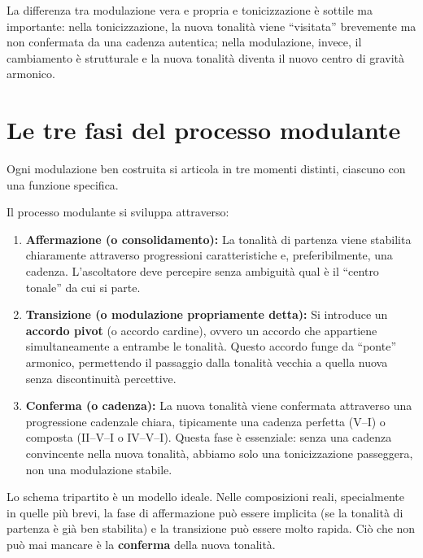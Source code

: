 La differenza tra modulazione vera e propria e tonicizzazione è sottile ma importante: nella tonicizzazione, la nuova tonalità viene ``visitata'' brevemente ma non confermata da una cadenza autentica; nella modulazione, invece, il cambiamento è strutturale e la nuova tonalità diventa il nuovo centro di gravità armonico.

\section{Le tre fasi del processo modulante}
\label{sec:fasi_modulazione}

Ogni modulazione ben costruita si articola in tre momenti distinti, ciascuno con una funzione specifica.

\begin{regola}
	\label{reg:tre_fasi_modulazione}
	Il processo modulante si sviluppa attraverso:
	
	\begin{enumerate}
		\item \textbf{Affermazione (o consolidamento):} La tonalità di partenza viene stabilita chiaramente attraverso progressioni caratteristiche e, preferibilmente, una cadenza. L'ascoltatore deve percepire senza ambiguità qual è il ``centro tonale'' da cui si parte.
		
		\item \textbf{Transizione (o modulazione propriamente detta):} Si introduce un \textbf{accordo pivot} (o accordo cardine), ovvero un accordo che appartiene simultaneamente a entrambe le tonalità. Questo accordo funge da ``ponte'' armonico, permettendo il passaggio dalla tonalità vecchia a quella nuova senza discontinuità percettive.
		
		\item \textbf{Conferma (o cadenza):} La nuova tonalità viene confermata attraverso una progressione cadenzale chiara, tipicamente una cadenza perfetta (V--I) o composta (II--V--I o IV--V--I). Questa fase è essenziale: senza una cadenza convincente nella nuova tonalità, abbiamo solo una tonicizzazione passeggera, non una modulazione stabile.
	\end{enumerate}
\end{regola}

Lo schema tripartito è un modello ideale. Nelle composizioni reali, specialmente in quelle più brevi, la fase di affermazione può essere implicita (se la tonalità di partenza è già ben stabilita) e la transizione può essere molto rapida. Ciò che non può mai mancare è la \textbf{conferma} della nuova tonalità.

